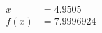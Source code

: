 \documentclass[preview]{standalone}
\begin{document}
\begin{align*}
x &= 4.9505\\f(x) &= 7.9996924
\end{align*}
\end{document}
